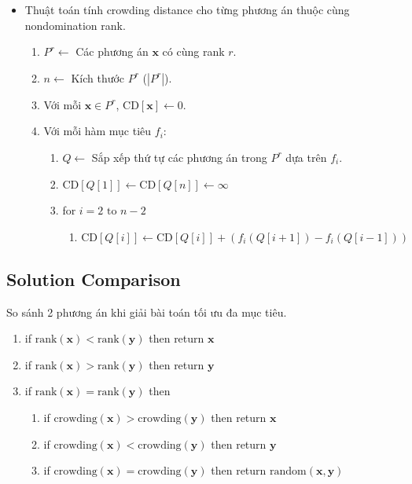 \documentclass{book}
\begin{document}
\begin{itemize}
    \item Thuật toán tính crowding distance cho từng phương án thuộc cùng nondomination rank.
    \begin{enumerate}
        \item $P^r \leftarrow$ Các phương án $\mathbf{x}$ có cùng rank $r$.
        \item $n \leftarrow$ Kích thước $P^r$ ($|P^r|$).
        \item Với mỗi $\mathbf{x} \in P^r$, $\text{CD}[\mathbf{x}] \leftarrow 0$.
        \item Với mỗi hàm mục tiêu $f_i$:
        \begin{enumerate}
            \item $Q \leftarrow$ Sắp xếp thứ tự các phương án trong $P^r$ dựa trên $f_i$.
            \item $\text{CD}[Q[1]] \leftarrow \text{CD}[Q[n]] \leftarrow \infty$
            \item for $i = 2 \text{ to } n-2$
            \begin{enumerate}
                \item $\text{CD}[Q[i]] \leftarrow \text{CD}[Q[i]] + (f_i(Q[i+1]) - f_i(Q[i-1]))$
            \end{enumerate}
        \end{enumerate}
    \end{enumerate}
\end{itemize}

\subsection{Solution Comparison}

So sánh 2 phương án khi giải bài toán tối ưu đa mục tiêu.

\begin{enumerate}
    \item if $\text{rank}(\mathbf{x}) < \text{rank}(\mathbf{y})$ then return $\mathbf{x}$
    \item if $\text{rank}(\mathbf{x}) > \text{rank}(\mathbf{y})$ then return $\mathbf{y}$
    \item if $\text{rank}(\mathbf{x}) = \text{rank}(\mathbf{y})$ then
    \begin{enumerate}
        \item if $\text{crowding}(\mathbf{x}) > \text{crowding}(\mathbf{y})$ then return $\mathbf{x}$
        \item if $\text{crowding}(\mathbf{x}) < \text{crowding}(\mathbf{y})$ then return $\mathbf{y}$
        \item if $\text{crowding}(\mathbf{x}) = \text{crowding}(\mathbf{y})$ then return $\text{random}(\mathbf{x},\mathbf{y})$
    \end{enumerate}
\end{enumerate}
\end{document}
